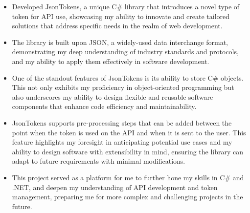 \documentclass[10pt,a4paper]{altacv}
\begin{document}
\begin{itemize}
    \item Developed JsonTokens, a unique C\# library that introduces a novel type of token for API use, showcasing my ability to innovate and create tailored solutions that address specific needs in the realm of web development.
    \item The library is built upon JSON, a widely-used data interchange format, demonstrating my deep understanding of industry standards and protocols, and my ability to apply them effectively in software development.
    \item One of the standout features of JsonTokens is its ability to store C\# objects. This not only exhibits my proficiency in object-oriented programming but also underscores my ability to design flexible and reusable software components that enhance code efficiency and maintainability.
    \item JsonTokens supports pre-processing steps that can be added between the point when the token is used on the API and when it is sent to the user. This feature highlights my foresight in anticipating potential use cases and my ability to design software with extensibility in mind, ensuring the library can adapt to future requirements with minimal modifications.
    \item This project served as a platform for me to further hone my skills in C\# and .NET, and deepen my understanding of API development and token management, preparing me for more complex and challenging projects in the future.
\end{itemize}


\divider
\newpage
{}
\end{document}
